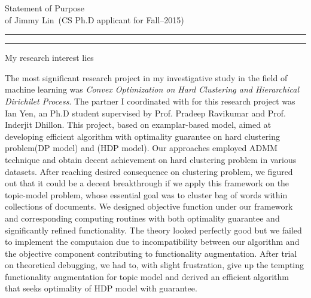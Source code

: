 \documentclass{article}
\newcommand{\soptitle}{Statement of Purpose}
\newcommand{\yourname}{Jimmy Lin}
\begin{document}
\begin{center}\LARGE\soptitle\\
\large of \yourname\ (CS Ph.D applicant for Fall--2015)
\end{center}

\hrule
\vspace{1pt}
\hrule height 1pt

\bigskip

My research interest lies 



The most significant research project in my investigative study in the field
of machine learning was \textit{Convex Optimization on Hard Clustering and
    Hierarchical Dirichilet Process}.
The partner I coordinated with for this research project was Ian Yen, an Ph.D
student supervised by Prof. Pradeep Ravikumar and Prof. Inderjit Dhillon.
This project, based on examplar-based model, aimed at developing efficient
algorithm with optimality guarantee on hard clustering problem(DP model) and 
(HDP model).
Our approaches employed ADMM technique and obtain decent achievement on hard
clustering problem in various datasets.
After reaching desired consequence on clustering problem, we figured out that
it could be a decent breakthrough if we apply this framework on the
topic-model problem, whose essential goal was to cluster bag of words within
collections of documents. 
We designed objective function under our framework and corresponding computing
routines with both optimality guarantee and significantly refined
functionality.  The theory looked perfectly good but we failed to implement the
computaion due to incompatibility between our algorithm and the
objective component contributing to functionality augmentation.
After trial on theoretical debugging, we had to, with slight frustration, give
up the tempting functionality augmentation for topic model and derived an
efficient algorithm that seeks optimality of HDP model with guarantee.
\end{document}
